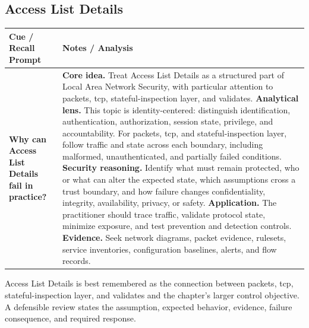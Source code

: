 \documentclass[11pt]{article}
\newcommand{\CornellHeader}{%
\rowcolor{Navy}\color{white}\bfseries Cue / Recall Prompt & \color{white}\bfseries Notes / Analysis\\\hline}
\newcommand{\CornellRow}[2]{%
\cellcolor{CueGray}\RaggedRight\textbf{#1} & \RaggedRight #2\\\hline}
\begin{document}
\subsection*{Access List Details}
\begin{longtable}{>{\RaggedRight\arraybackslash}p{}|>{\RaggedRight\arraybackslash}p{}}
\CornellHeader
\CornellRow{Why can Access List Details fail in practice?}{\textbf{Core idea.} Treat Access List Details as a structured part of Local Area Network Security, with particular attention to packets, tcp, stateful-inspection layer, and validates. \textbf{Analytical lens.} This topic is identity-centered: distinguish identification, authentication, authorization, session state, privilege, and accountability. For packets, tcp, and stateful-inspection layer, follow traffic and state across each boundary, including malformed, unauthenticated, and partially failed conditions. \textbf{Security reasoning.} Identify what must remain protected, who or what can alter the expected state, which assumptions cross a trust boundary, and how failure changes confidentiality, integrity, availability, privacy, or safety. \textbf{Application.} The practitioner should trace traffic, validate protocol state, minimize exposure, and test prevention and detection controls. \textbf{Evidence.} Seek network diagrams, packet evidence, rulesets, service inventories, configuration baselines, alerts, and flow records.}
\end{longtable}
\begin{topicsummary}
Access List Details is best remembered as the connection between packets, tcp, stateful-inspection layer, and validates and the chapter's larger control objective. A defensible review states the assumption, expected behavior, evidence, failure consequence, and required response.
\end{topicsummary}
\end{document}
